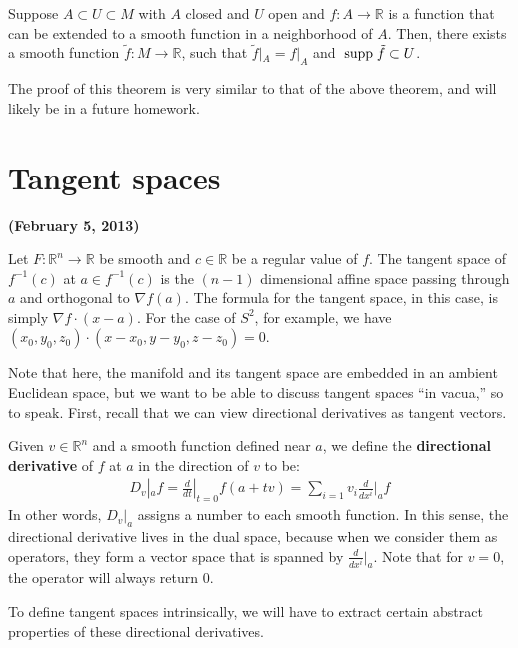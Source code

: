 \documentclass{../mathnotes}
\begin{document}
\begin{thm}
    Suppose $A\subset U\subset M$ with $A$ closed and $U$ open and $f:A\to \mathbb{R}$ is a function that can be extended to a smooth function in a neighborhood of $A$.
    Then, there exists a smooth function $\tilde{f}:M\to\mathbb{R}$, such that $\tilde{f}|_A=f|_A$ and $\;\textnormal{supp}\;\tilde{f}\subset U$.
\end{thm}
The proof of this theorem is very similar to that of the above theorem, and will likely be in a future homework.

\newpage

\section{Tangent spaces}

\textbf{(February 5, 2013)}

\begin{exmp}
    Let $F:\mathbb{R}^n\to \mathbb{R}$ be smooth and $c\in\mathbb{R}$ be a regular value of $f$. The tangent space of $f^{-1}(c)$ at $a\in f^{-1}(c)$
    is the $(n-1)$ dimensional affine space passing through $a$ and orthogonal to $\nabla f(a)$. The formula for the tangent space, in this case,
    is simply $\nabla f\cdot (x-a)$. For the case of $S^2$, for example, we have $(x_0,y_0,z_0)\cdot(x-x_0,y-y_0,z-z_0)=0$.
\end{exmp}

Note that here, the manifold and its tangent space are embedded in an ambient Euclidean space, but we want to be able to discuss tangent spaces ``in vacua,''
so to speak. First, recall that we can view directional derivatives as tangent vectors.

\begin{defn}
    Given $v\in\mathbb{R}^n$ and a smooth function defined near $a$, we define the \textbf{directional derivative} of $f$ at $a$ in the direction of $v$ to be:
    \begin{align*}
        D_v|_a f=\frac{d}{dt}|_{t=0}f(a+tv)=\sum_{i=1}v_i\frac{d}{dx^i}|_a f
    \end{align*}
    In other words, $D_v|_a$ assigns a number to each smooth function. In this sense, the directional derivative lives in the dual space, because when we
    consider them as operators, they form a vector space that is spanned by $\frac{d}{dx^i}|_a$. Note that for $v=0$, the operator will always return 0. 
\end{defn}

To define tangent spaces intrinsically, we will have to extract certain abstract properties of these directional derivatives.
\end{document}
